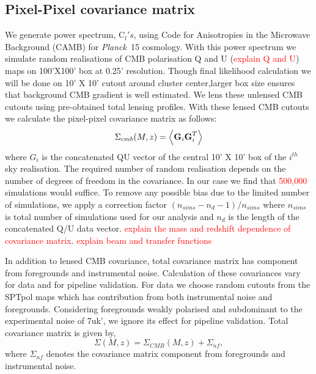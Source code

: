 \documentclass[twocolumn]{aastex61}
\newcommand{\pending}[1]{\textcolor{red}{#1}}
\newcommand{\planck}{{\it Planck}}
\begin{document}
\subsection{Pixel-Pixel covariance matrix}
We generate power spectrum, C$_{l}'s$, using Code for Anisotropies in the Microwave Background (CAMB) for \planck\ 15 cosmology. With this power spectrum we simulate random realisations of CMB polarisation Q and U (\pending{explain Q and U}) maps on 100'X100' box at 0.25' resolution. Though final likelihood calculation we will be done on 10' X 10' cutout around cluster center,larger box size ensures that background CMB gradient is well estimated. We lens these unlensed CMB cutouts using pre-obtained total lensing profiles. With these lensed CMB cutouts we calculate the pixel-pixel covariance matrix as follows:
\begin{equation}
\Sigma_{cmb}(M,z)  =  \left<\textrm{\textbf{G}}_i  \textrm{\textbf{G}}_i ^{T}\right>
\label{eq_lensed_cmb_cov_mass_z}
\end{equation}
where $G_{i}$ is the concatenated QU vector of the central 10' X 10' box of the $i^{th}$ sky realisation. The required number of random realisation depends on the number of degrees of freedom in the covariance. In our case we find that \pending{500,000} simulations would suffice. To remove any possible bias due to the limited number of simulations, we apply a correction factor $(n_{sims} - n_{d} -1)/n_{sims}$ where $n_{sims}$ is total number of simulations used for our analysis and $n_{d}$ is the length of the concatenated Q/U data vector. \pending{explain the mass and redshift dependence of covariance matrix}. \pending{explain beam and transfer functions}

In addition to lensed CMB covariance, total covariance matrix has component from foregrounds and instrumental noise. Calculation of these covariances vary for data and for pipeline validation. For data we choose random cutouts from the SPTpol maps which has contribution from both instrumental noise and foregrounds. Considering foregrounds weakly polarised and subdominant to the experimental noise of 7uk', we ignore its effect for pipeline validation. Total covariance matrix is given by,
\begin{equation}
\Sigma(M,z) = \Sigma_{CMB}(M,z) + \Sigma_{nf},
\end{equation} 
where $\Sigma_{nf}$ denotes the covariance matrix component from foregrounds and instrumental noise.
\end{document}
